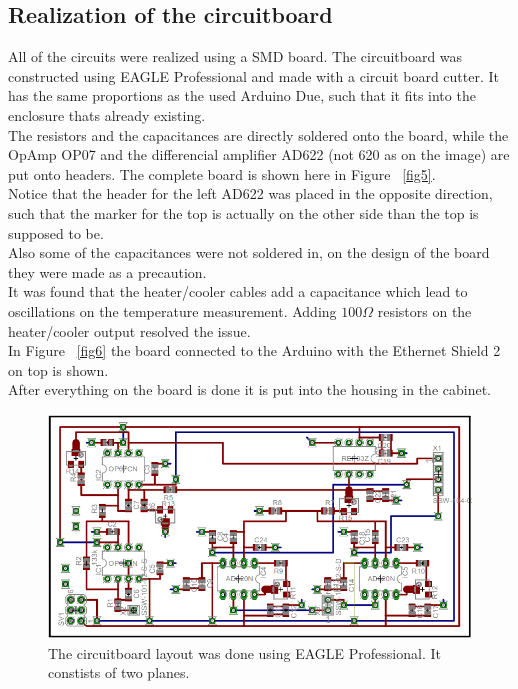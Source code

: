 \documentclass[12pt]{scrartcl}
\begin{document}
    \subsection{Realization of the circuitboard}
      All of the circuits were realized using a SMD board. The circuitboard was
      constructed using EAGLE Professional and made with a circuit board cutter.
      It has the same proportions as the used Arduino Due, such that it fits
      into the enclosure thats already existing.
      \\The resistors and the capacitances are directly soldered onto the board,
      while the OpAmp OP07 and the differencial amplifier AD622
      (not 620 as on the image) are put onto
      headers. The complete board is shown here in Figure~ \ref{fig5}.
      \\ Notice that the header for the left AD622 was placed in the opposite
      direction, such that the marker for the top is actually on the other side
      than the top is supposed to be.\\
      Also some of the capacitances were not soldered in, on the design of the
      board they were made as a precaution.\\
      It was found that the heater/cooler cables add a capacitance which lead
      to oscillations on the temperature measurement. Adding $100 \Omega$
      resistors on the heater/cooler output resolved the issue.\\ In Figure~
      \ref{fig6} the board connected to the Arduino with the Ethernet
      Shield 2 on top is shown. \\
      After everything on the board is done it is put into the housing in the
      cabinet.
      \begin{figure}[H]
        \includegraphics[width = \textwidth]{board.png}
        \caption{The circuitboard layout was done using EAGLE Professional.
        It constists of two planes.}
        \label{fig4}
      \end{figure}
\end{document}
